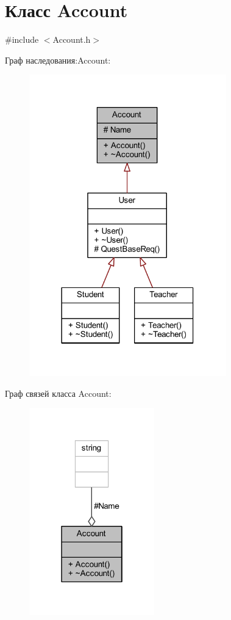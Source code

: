 \hypertarget{class_account}{}\section{Класс Account}
\label{class_account}


{\ttfamily \#include $<$Account.\+h$>$}



Граф наследования\+:Account\+:\nopagebreak
\begin{figure}[H]
\begin{center}
\leavevmode
\includegraphics[width=242pt]{d6/d83/class_account__inherit__graph}
\end{center}
\end{figure}


Граф связей класса Account\+:\nopagebreak
\begin{figure}[H]
\begin{center}
\leavevmode
\includegraphics[width=154pt]{d5/d1b/class_account__coll__graph}
\end{center}
\end{figure}
